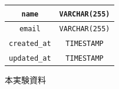 \documentclass[a4paper]{ltjsarticle}
\begin{document}
\begin{table}[ht]
\begin{minipage}[t]{.49\textwidth}
\begin{tabular}{|c|c|}
                    \verb|name| & \verb|VARCHAR(255)| \\ \hline
                    \verb|email| & \verb|VARCHAR(255)| \\ \hline
                    \verb|created_at| & \verb|TIMESTAMP| \\ \hline
                    \verb|updated_at| & \verb|TIMESTAMP| \\ \hline
                \end{tabular}
            \end{minipage}
        \end{table}

\begin{thebibliography}{9}
     本実験資料
\end{thebibliography}
\end{document}
